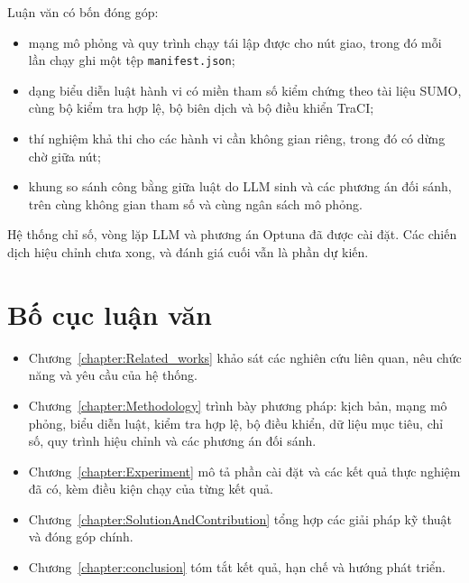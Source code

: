 \documentclass[../DoAn.tex]{subfiles}
\begin{document}
Luận văn có bốn đóng góp:
\begin{itemize}
    \item mạng mô phỏng và quy trình chạy tái lập được cho nút giao, trong đó mỗi lần chạy ghi một tệp \texttt{manifest.json};
    \item dạng biểu diễn luật hành vi có miền tham số kiểm chứng theo tài liệu SUMO, cùng bộ kiểm tra hợp lệ, bộ biên dịch và bộ điều khiển TraCI;
    \item thí nghiệm khả thi cho các hành vi cần không gian riêng, trong đó có dừng chờ giữa nút;
    \item khung so sánh công bằng giữa luật do LLM sinh và các phương án đối sánh, trên cùng không gian tham số và cùng ngân sách mô phỏng.
\end{itemize}
Hệ thống chỉ số, vòng lặp LLM và phương án Optuna đã được cài đặt. Các chiến dịch hiệu chỉnh chưa xong, và đánh giá cuối vẫn là phần dự kiến.

\section{Bố cục luận văn}
\label{section:1.4}

\begin{itemize}
    \item Chương~\ref{chapter:Related_works} khảo sát các nghiên cứu liên quan, nêu chức năng và yêu cầu của hệ thống.
    \item Chương~\ref{chapter:Methodology} trình bày phương pháp: kịch bản, mạng mô phỏng, biểu diễn luật, kiểm tra hợp lệ, bộ điều khiển, dữ liệu mục tiêu, chỉ số, quy trình hiệu chỉnh và các phương án đối sánh.
    \item Chương~\ref{chapter:Experiment} mô tả phần cài đặt và các kết quả thực nghiệm đã có, kèm điều kiện chạy của từng kết quả.
    \item Chương~\ref{chapter:SolutionAndContribution} tổng hợp các giải pháp kỹ thuật và đóng góp chính.
    \item Chương~\ref{chapter:conclusion} tóm tắt kết quả, hạn chế và hướng phát triển.
\end{itemize}
\end{document}
